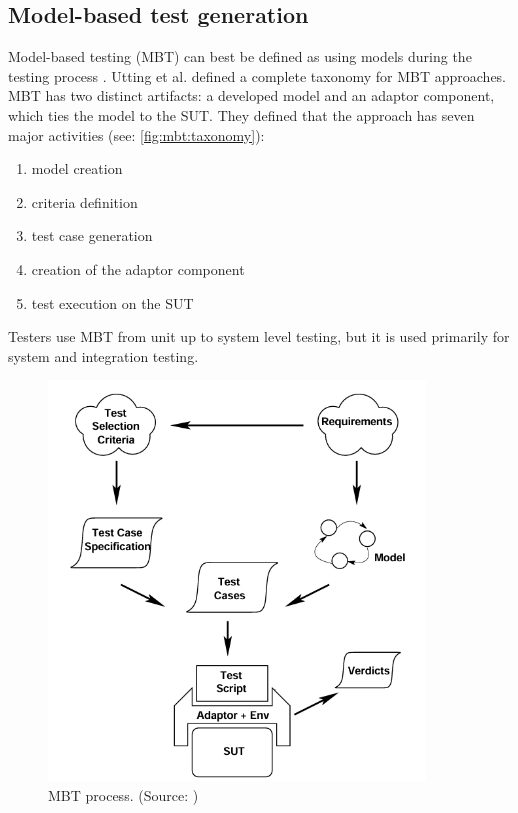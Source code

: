 \subsection{Model-based test generation}

Model-based testing (MBT) can best be defined as using models during the testing process \cite{cmbt:syllabus:2015}. Utting et al. \cite{utting2012taxonomy} defined a complete taxonomy for MBT approaches. MBT has two distinct artifacts: a developed model and an adaptor component, which ties the model to the SUT. They defined that the approach has seven major activities (see: \autoref{fig:mbt:taxonomy}):
\begin{enumerate}
    \item model creation
    \item criteria definition
    \item test case generation
    \item creation of the adaptor component
    \item test execution on the SUT
\end{enumerate}
Testers use MBT from unit up to system level testing, but it is used primarily for system and integration testing.

\begin{figure}
    \centering
    \includegraphics[width=100mm, keepaspectratio]{figures/mbt-taxonomy_uttinger.png}
    \caption{MBT process. (Source: \cite{utting2012taxonomy})}
    \label{fig:mbt:taxonomy}
\end{figure}


